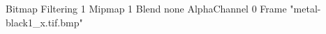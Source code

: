 {Bitmap
	{Filtering 1}
	{Mipmap 1}
	{Blend none}
	{AlphaChannel 0}
	{Frame "metal-black1_x.tif.bmp"}
}
